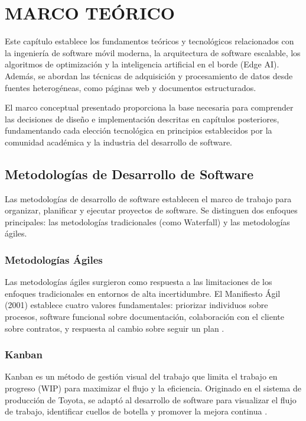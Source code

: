 \chapter{MARCO TEÓRICO}
\label{chap:marco-teorico}

Este capítulo establece los fundamentos teóricos y tecnológicos relacionados con la ingeniería de software móvil moderna, la arquitectura de software escalable, los algoritmos de optimización y la inteligencia artificial en el borde (Edge AI). Además, se abordan las técnicas de adquisición y procesamiento de datos desde fuentes heterogéneas, como páginas web y documentos estructurados.

El marco conceptual presentado proporciona la base necesaria para comprender las decisiones de diseño e implementación descritas en capítulos posteriores, fundamentando cada elección tecnológica en principios establecidos por la comunidad académica y la industria del desarrollo de software.

\section{Metodologías de Desarrollo de Software}
\label{sec:metodologias}

Las metodologías de desarrollo de software establecen el marco de trabajo para organizar, planificar y ejecutar proyectos de software. Se distinguen dos enfoques principales: las metodologías tradicionales (como Waterfall) y las metodologías ágiles.

\subsection{Metodologías Ágiles}
Las metodologías ágiles surgieron como respuesta a las limitaciones de los enfoques tradicionales en entornos de alta incertidumbre. El Manifiesto Ágil (2001) establece cuatro valores fundamentales: priorizar individuos sobre procesos, software funcional sobre documentación, colaboración con el cliente sobre contratos, y respuesta al cambio sobre seguir un plan \cite{agile_manifesto}.

\subsection{Kanban}
Kanban es un método de gestión visual del trabajo que limita el trabajo en progreso (WIP) para maximizar el flujo y la eficiencia. Originado en el sistema de producción de Toyota, se adaptó al desarrollo de software para visualizar el flujo de trabajo, identificar cuellos de botella y promover la mejora continua \cite{kanban_anderson}.

